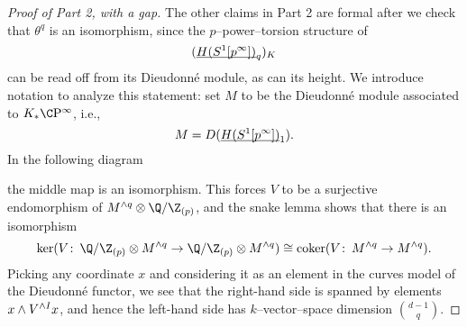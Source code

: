 \begin{proof}[Proof of Part 2, with a gap]\renewcommand{\qedsymbol}{\relax}
The other claims in Part 2 are formal after we check that \(\theta^q\) is an isomorphism, since the \(p\)--power--torsion structure of \[(\underline{\smash{H(S^1[p^\infty])}}_{q})_K\] can be read off from its Dieudonn\'e module, as can its height.  We introduce notation to analyze this statement: set \(M\) to be the Dieudonn\'e module associated to \(K_* \CP^\infty\), i.e., \[M = D(\underline{\smash{H(S^1[p^\infty])}}_{1}).\]  In the following diagram
\begin{center}
\end{center}
the middle map is an isomorphism.  This forces \(V\) to be a surjective endomorphism of \(M^{\wedge q} \otimes \Q/\Z_{(p)}\), and the snake lemma shows that there is an isomorphism \[\ker(V\co \Q/\Z_{(p)} \otimes M^{\wedge q} \to \Q/\Z_{(p)} \otimes M^{\wedge q}) \cong \operatorname{coker}(V\co M^{\wedge q} \to M^{\wedge q}).\]  Picking any coordinate \(x\) and considering it as an element in the curves model of the Dieudonn\'e functor, we see that the right-hand side is spanned by elements \(x \wedge V^{\wedge I} x\), and hence the left-hand side has \(k\)--vector--space dimension \(\binom{d-1}{q}\).


\end{proof}
